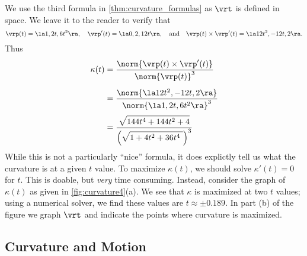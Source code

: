 {We use the third formula in \autoref{thm:curvature_formulas} as $\vrt$ is defined in space. We leave it to the reader to verify that 
$$\vrp(t) =\la 1,2t,6t^2\ra,\quad \vrp'(t) = \la 0,2,12t\ra,\quad \text{and}\quad \vrp(t)\times \vrp'(t) = \la 12t^2,-12t,2\ra.$$
Thus 
\begin{align*}
\kappa(t) &= \frac{\norm{\vrp(t)\times\vrp'(t)}}{\norm{\vrp(t)}^3} \\
				&= \rule{0pt}{20pt}\frac{\norm{\la 12t^2,-12t,2\ra}}{\norm{\la 1,2t,6t^2\ra}^3} \\
				&= \rule{0pt}{20pt}\frac{\sqrt{\rule{0pt}{8.5pt}144t^4+144t^2+4}}{\left(\sqrt{\rule{0pt}{8.5pt}1+4t^2+36t^4\ }\right)^3}
\end{align*}
While this is not a particularly ``nice'' formula, it does explictly tell us what the curvature is at a given $t$ value. To maximize $\kappa(t)$, we should solve $\kappa'(t)=0$ for $t$. This is doable, but \emph{very} time consuming. Instead, consider the graph of $\kappa(t)$ as given in \autoref{fig:curvature4}(a). We see that $\kappa$ is maximized at two $t$ values; using a numerical solver, we find these values are $t\approx\pm 0.189$. In part (b) of the figure we graph $\vrt$ and indicate the points where curvature is maximized.}

\subsection*{Curvature and Motion}

